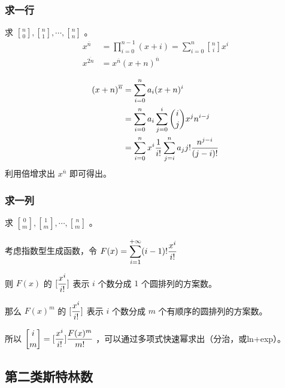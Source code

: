 \subsubsection{求一行}

求 ${n\brack 0},{n\brack 1},\cdots,{n\brack n}$ 。
$$
\begin{aligned}
x^{\overline{n}}&=\prod_{i=0}^{n-1}(x+i)=\sum_{i=0}^{n}{n\brack i}x^i\\
x^{\overline{2n}}&=x^{\overline{n}}(x+n)^{\overline n}\\
\end{aligned}
$$
$$
\begin{aligned}
(x+n)^{\overline n}&=\sum_{i=0}^{n}a_i(x+n)^i\\
&=\sum_{i=0}^{n}a_i\sum_{j=0}^{i}{i\choose j}x^jn^{i-j}\\
&=\sum_{i=0}^{n}x^i{1\over i!}\sum_{j=i}^{n}a_jj!{n^{j-i}\over(j-i)!}\\
\end{aligned}
$$
利用倍增求出 $x^{\overline{n}}$ 即可得出。



\newpage

\subsubsection{求一列}

求 ${0\brack m},{1\brack m},\cdots,{n\brack m}$ 。

考虑指数型生成函数，令 $\displaystyle F(x)=\sum_{i=1}^{+\infty}(i-1)!{x^i\over i!}$

则 $F(x)$ 的 $\displaystyle [{x^i\over i!}]$ 表示 $i$ 个数分成 $1$ 个圆排列的方案数。

那么 $F(x)^m$ 的 $\displaystyle [{x^i\over i!}]$ 表示 $i$ 个数分成 $m$ 个有顺序的圆排列的方案数。

\vspace{0.2cm}

所以 $\displaystyle {i\brack m}=[{x^i\over i!}]{F(x)^m\over m!}$ ，可以通过多项式快速幂求出（分治，或ln+exp）。

\vspace{0.3cm}



\subsection{第二类斯特林数}


